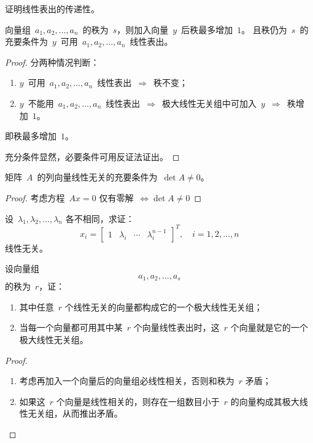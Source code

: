 \documentclass[twoside,openright]{book}
\begin{document}
\begin{CJK*}{UTF8}{}
\begin{quest}
\label{quest:113}
证明线性表出的传递性。
\end{quest}

\begin{quest}
\label{quest:114}
向量组\ $a_1, a_2,\dots,a_n$\ 的秩为\ $s$，则加入向量\ $y$\ 后秩最多增加\ $1$。
且秩仍为\ $s$\ 的充要条件为\ $y$\ 可用\ $a_1, a_2,\dots,a_n$\ 线性表出。
\end{quest}
\begin{proof}
分两种情况判断：
\begin{enumerate}
\item
$y$\ 可用\ $a_1, a_2,\dots,a_n$\ 线性表出\ $\Longrightarrow$\ 秩不变；
\item
$y$\ 不能用\ $a_1, a_2,\dots,a_n$\ 线性表出\ $\Longrightarrow$\ 极大线性无关组中可加入\ $y$\ $\Longrightarrow$\ 秩增加\ $1$。
\end{enumerate}
即秩最多增加\ $1$。

充分条件显然，必要条件可用反证法证出。
\end{proof}

\begin{quest}
\label{quest:115}
矩阵\ $A$\ 的列向量线性无关的充要条件为\ $\det{A} \neq 0$。
\end{quest}
\begin{proof}
考虑方程\ $Ax=0$ 仅有零解\ $\Longleftrightarrow \det{A} \neq 0$
\end{proof}

\begin{quest}
\label{quest:116}
设\ $\lambda_1,\lambda_2,\dots,\lambda_{n}$ 各不相同，求证：
\[
x_i =
\begin{bmatrix}
1 & \lambda_i & \cdots & \lambda_i^{n-1}
\end{bmatrix}^T,\quad i=1,2,\dotsc,n
\]
线性无关。
\end{quest}

\begin{quest}
\label{quest:117}
设向量组
\[
a_1, a_2,\dots,a_s
\]
的秩为\ $r$，证：
\begin{enumerate}
\item
其中任意\ $r$ 个线性无关的向量都构成它的一个极大线性无关组；
\item
当每一个向量都可用其中某\ $r$ 个向量线性表出时，这\ $r$ 个向量就是它的一个极大线性无关组。
\end{enumerate}
\end{quest}
\begin{proof}
$ $

\begin{enumerate}
\item
考虑再加入一个向量后的向量组必线性相关，否则和秩为\ $r$ 矛盾；
\item
如果这\ $r$ 个向量是线性相关的，则存在一组数目小于\ $r$ 的向量构成其极大线性无关组，从而推出矛盾。
\end{enumerate}
\end{proof}


\end{CJK*}
\end{document}

